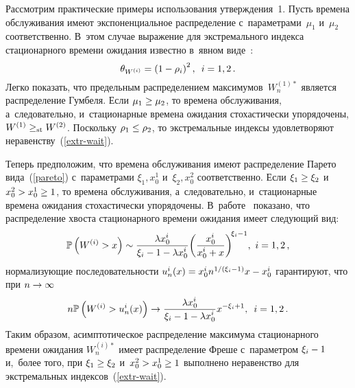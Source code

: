 \begin{multicols}{2}
\smallskip

Рассмотрим практические примеры использования утверж\-де\-ния~1. Пусть времена 
обслуживания имеют экспоненциальное распределение с~па\-ра\-мет\-ра\-ми~$\mu_1$ 
и~$\mu_2$ соответственно. В~этом случае  выражение  для экстремального индекса 
стационарного времени ожидания известно в~явном виде~\cite{Hooghiemstra}:
\begin{equation*}
  \theta_{W^{(i)}} = \left(1-\rho_i\right)^2, \enskip i=1,2\,.
\end{equation*}
Легко показать, что предельным распределением максимумов~$W_n^{(1)*}$ является 
распределение Гумбеля.  Если $\mu_1\hm\ge \mu_2$, то   времена обслуживания, 
а~следовательно, и~стационарные времена ожидания  стохастически упорядочены, 
$W^{(1)}\hm{\ge_{\mathrm{st}}} W^{(2)}$. Поскольку $\rho_1\hm\le \rho_2$, то экстремальные 
индексы удовле\-тво\-ря\-ют неравенству~(\ref{extr-wait}).


Теперь  предположим, что  времена обслуживания  имеют распределение Парето вида~(\ref{pareto}) 
с~па\-ра\-мет\-ра\-ми $\xi_1, x_0^1$ и~$\xi_2, x_0^2$ соответственно. 
Если
$\xi_1\hm\ge  \xi_2$ и~$x_0^2\hm>x_0^1\ge 1$,  то   времена обслуживания, 
а~следовательно, и~стационарные времена ожидания  стохастически упорядочены.
В~работе~\cite{dccn2021} показано, что
распределение хвоста стационарного времени ожидания имеет сле\-ду\-ющий  вид:
\begin{equation*}
\mathbb{P}  \left(W^{(i)} > x\right) \sim \displaystyle\frac{\displaystyle \lambda x_0^i\mathstrut}{\displaystyle \xi_i-1-\lambda x_0^i\mathstrut} \! \left( 
\displaystyle\frac{\displaystyle x_0^i\mathstrut}{\displaystyle x_0^i +x\mathstrut} \right )^{\!\xi_i-1}\!, \ i=1,2\,,
\end{equation*}
нормализующие последовательности  $u_n^i(x)\hm=x_0^i n^{1/(\xi_i-1)}x \hm- x_0^i$ 
гарантируют, что при $n\hm\to\infty$
\begin{equation*}
    n\mathbb{P} \left(W^{(i)} > u_n^i (x)\right) \to  \displaystyle\frac{\displaystyle \lambda x_0^i \mathstrut}{\displaystyle \xi_i-1-\lambda 
x_0^i\mathstrut}x^{-\xi_i+1}, \enskip i=1,2\,.
\end{equation*}
Таким образом, асимптотическое распределение максимума стационарного времени 
ожидания $W_n^{(i)*}$ имеет распределение  Фреше с~параметром  $\xi_i\hm-1$ 
и,~более того, при $\xi_1\hm\ge  \xi_2$ и~$x_0^2\hm>x_0^1\hm\ge 1$ выполнено неравенство для 
экстремальных индексов~(\ref{extr-wait}).



\end{multicols}
